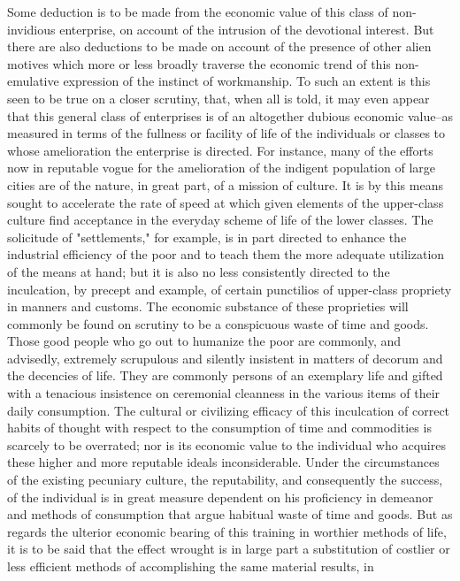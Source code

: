 \documentclass[12pt]{report}
\begin{document}
Some deduction is to be made from the economic value of this class of
non-invidious enterprise, on account of the intrusion of the devotional
interest. But there are also deductions to be made on account of the
presence of other alien motives which more or less broadly traverse
the economic trend of this non-emulative expression of the instinct
of workmanship. To such an extent is this seen to be true on a closer
scrutiny, that, when all is told, it may even appear that this general
class of enterprises is of an altogether dubious economic value--as
measured in terms of the fullness or facility of life of the individuals
or classes to whose amelioration the enterprise is directed.
For instance, many of the efforts now in reputable vogue for the
amelioration of the indigent population of large cities are of the
nature, in great part, of a mission of culture. It is by this means
sought to accelerate the rate of speed at which given elements of the
upper-class culture find acceptance in the everyday scheme of life of
the lower classes. The solicitude of "settlements," for example, is in
part directed to enhance the industrial efficiency of the poor and to
teach them the more adequate utilization of the means at hand; but it
is also no less consistently directed to the inculcation, by precept and
example, of certain punctilios of upper-class propriety in manners and
customs. The economic substance of these proprieties will commonly be
found on scrutiny to be a conspicuous waste of time and goods. Those
good people who go out to humanize the poor are commonly, and advisedly,
extremely scrupulous and silently insistent in matters of decorum and
the decencies of life. They are commonly persons of an exemplary life
and gifted with a tenacious insistence on ceremonial cleanness in the
various items of their daily consumption. The cultural or civilizing
efficacy of this inculcation of correct habits of thought with respect
to the consumption of time and commodities is scarcely to be overrated;
nor is its economic value to the individual who acquires these higher
and more reputable ideals inconsiderable. Under the circumstances of
the existing pecuniary culture, the reputability, and consequently
the success, of the individual is in great measure dependent on his
proficiency in demeanor and methods of consumption that argue habitual
waste of time and goods. But as regards the ulterior economic bearing
of this training in worthier methods of life, it is to be said that
the effect wrought is in large part a substitution of costlier or
less efficient methods of accomplishing the same material results, in
\end{document}

